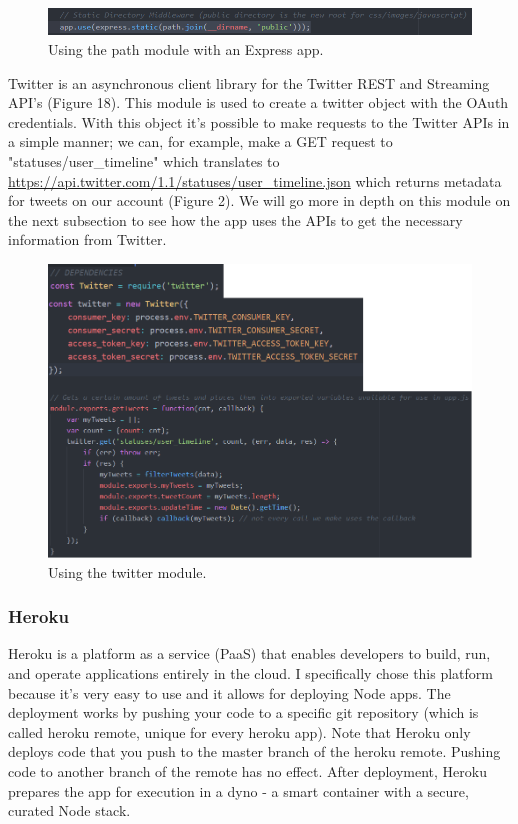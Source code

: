 \documentclass[12pt]{article} %
\begin{document}
	\begin{figure}[H] %
	\includegraphics[width=1\linewidth]{images/pathStatic}
	\caption{Using the path module with an Express app.}
	\label{pathStatic}
	\end{figure}

	\noindent Twitter \cite{twitter} is an asynchronous client library for the Twitter REST and Streaming API's (Figure 18).
	This module is used to create a twitter object with the OAuth credentials. With this object it's possible to make requests to the Twitter APIs in a simple manner; we can, for example,
	make a GET request to "statuses/user\_timeline" which translates to \url{https://api.twitter.com/1.1/statuses/user\_timeline.json} which returns metadata for tweets on our 			account (Figure 2).
	We will go more in depth on this module on the next subsection to see how the app uses the APIs to get the necessary information from Twitter.

	\begin{figure}[H] %
	\includegraphics[width=1\linewidth]{images/twitter}
	\caption{Using the twitter module.}
	\label{twitter}
	\end{figure}

	 \subsubsection{Heroku \cite{heroku}}  Heroku is a platform as a service (PaaS) that enables developers to build, run, and operate applications entirely in the cloud.
	I specifically chose this platform because it's very easy to use and it allows for deploying Node apps.
	The deployment \cite{herokudeploy} works by pushing your code to a specific git repository (which is called heroku remote, unique for every heroku app). 
	Note that Heroku only deploys code that you push to the master branch of the heroku remote. Pushing code to another branch of the remote has no effect. After deployment, 			Heroku prepares the app for execution in a dyno - a smart container with a secure, curated Node stack.	
\end{document}
